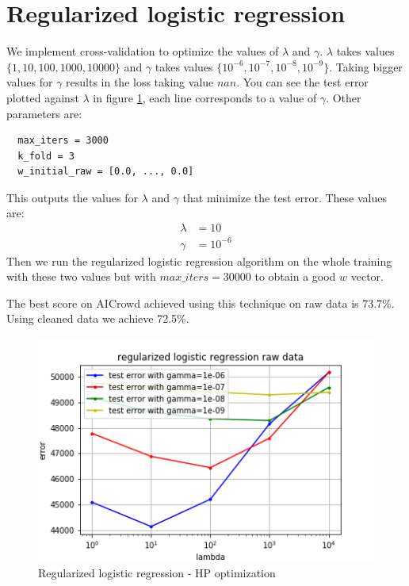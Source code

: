 \documentclass[11pt, a4paper, twocolumn]{article}
\begin{document}
\newpage
\section{Regularized logistic regression}
We implement cross-validation to optimize the values of $\lambda$ and $\gamma$. $\lambda$ takes values
$\{1,10,100,1000,10000\}$ and $\gamma$ takes values $\{10^{-6},10^{-7},10^{-8},10^{-9}\}$. Taking bigger
values for $\gamma$ results in the loss taking value $nan$. You can see the test error plotted against $\lambda$ in figure \ref{fig:raw_reg_log_regr}, each line corresponds to a value of $\gamma$. Other parameters are: 
\begin{lstlisting}
  max_iters = 3000
  k_fold = 3
  w_initial_raw = [0.0, ..., 0.0]
\end{lstlisting}

This outputs the values for $\lambda$ and $\gamma$ that minimize the test error. These values are:
\begin{align*}
  \lambda &= 10 \\
  \gamma &= 10^{-6}
\end{align*}
Then we run the regularized logistic regression algorithm on the whole training with these two values but with $max\_iters = 30000$ to obtain a good $w$ vector.

The best score on AICrowd achieved using this technique on raw data is 73.7\%. Using cleaned data we achieve 72.5\%.
\begin{figure}[h!]
  \includegraphics[width=\linewidth]{plots/raw_data_reg_log_regr.png}
  \caption{Regularized logistic regression - HP optimization}
  \label{fig:raw_reg_log_regr}
\end{figure}
\end{document}

